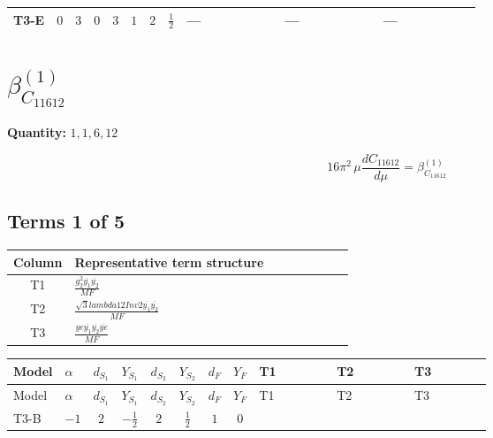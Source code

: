 \documentclass[8pt]{article}
\begin{document}
\begin{landscape}
\begin{longtable}{@{}llcccccc >{\raggedright\arraybackslash}p{0.21\linewidth} >{\raggedright\arraybackslash}p{0.21\linewidth} >{\raggedright\arraybackslash}p{0.21\linewidth}@{}}
\midrule
T3-E & $0$ & $3$ & $0$ & $3$ & $1$ & $2$ & $\frac{1}{2}$ & --- & --- & --- \\
\midrule
\bottomrule
\end{longtable}
\clearpage
\section*{$\beta_{C_{11612}}^{(1)}$}
\noindent\textbf{Quantity: }$\mathrm{1,1,6,12}$\par\smallskip
\[16\pi^2\,\mu\frac{d C_{11612}}{d\mu}=\beta_{C_{11612}}^{(1)}\]
\subsection*{Terms 1 of 5}
\begin{center}
\begin{tabular}{@{}c >{\raggedright\arraybackslash}p{0.82\linewidth}@{}}
\toprule
Column & Representative term structure \\
\midrule
T1 & \(\displaystyle \frac{g_{2}^{2} \overline{y_{1}} \overline{y_{2}}}{MF}\) \\
\midrule
T2 & \(\displaystyle \frac{\sqrt{3} lambda12Inv2 \overline{y_{1}} \overline{y_{2}}}{MF}\) \\
\midrule
T3 & \(\displaystyle \frac{ye \overline{y_{1}} \overline{y_{2}} \overline{ye}}{MF}\) \\
\midrule
\bottomrule
\end{tabular}
\end{center}
\smallskip
\tiny
\begin{longtable}{@{}llcccccc >{\raggedright\arraybackslash}p{0.21\linewidth} >{\raggedright\arraybackslash}p{0.21\linewidth} >{\raggedright\arraybackslash}p{0.21\linewidth}@{}}
\toprule
Model & $\alpha$ & $d_{S_1}$ & $Y_{S_1}$ & $d_{S_2}$ & $Y_{S_2}$ & $d_F$ & $Y_F$ & T1 & T2 & T3 \\
\midrule
\endfirsthead
\toprule
Model & $\alpha$ & $d_{S_1}$ & $Y_{S_1}$ & $d_{S_2}$ & $Y_{S_2}$ & $d_F$ & $Y_F$ & T1 & T2 & T3 \\
\midrule
\endhead
T3-B & $-1$ & $2$ & $-\frac{1}{2}$ & $2$ & $\frac{1}{2}$ & $1$ & $0$ & \scriptsize\adjustbox{max width=\linewidth}{$\begin{gathered} - \frac{3 g_{2}^{2} \overline{y_{1}} \overline{y_{2}}}{4 MF}\end{gathered}$} & \scriptsize\adjustbox{max width=\linewidth}{$\begin{gathered} - \frac{\sqrt{3} lambda12Inv2 \overline{y_{1}} \overline{y_{2}}}{3 MF}\end{gathered}$} & \scriptsize\adjustbox{max width=\linewidth}{$\begin{gathered} \frac{ye \overline{y_{1}} \overline{y_{2}} \overline{ye}}{4 MF}\end{gathered}$} \\

\end{longtable}
\end{landscape}
\end{document}
